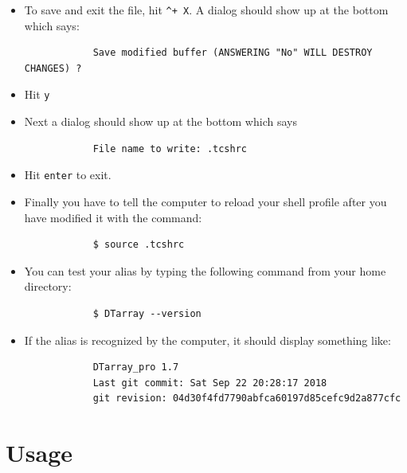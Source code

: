 \documentclass[12pt]{article}
\begin{document}
\begin{itemize}
		\item To save and exit the file, hit \texttt{\textasciicircum + X}. A dialog should show up at the bottom which says: 
		\begin{lstlisting}
			Save modified buffer (ANSWERING "No" WILL DESTROY CHANGES) ?
		\end{lstlisting}
		\item Hit \texttt{y}
		
		\item Next a dialog should show up at the bottom which says 
		
		\begin{lstlisting}
			File name to write: .tcshrc
		\end{lstlisting}
		
		\item Hit \texttt{enter} to exit.
		
		\item Finally you have to tell the computer to reload your shell profile after you have modified it with the command:
		
		\begin{lstlisting}
			$ source .tcshrc
		\end{lstlisting}
		
		\item You can test your alias by typing the following command from your home directory:
		
		\begin{lstlisting}
			$ DTarray --version
		\end{lstlisting}
		
		\item If the alias is recognized by the computer, it should display something like:
		
		\begin{lstlisting}
			DTarray_pro 1.7
			Last git commit: Sat Sep 22 20:28:17 2018
			git revision: 04d30f4fd7790abfca60197d85cefc9d2a877cfc
		\end{lstlisting}
		
	\end{itemize}
	
	\section{Usage}
	
\end{document}
